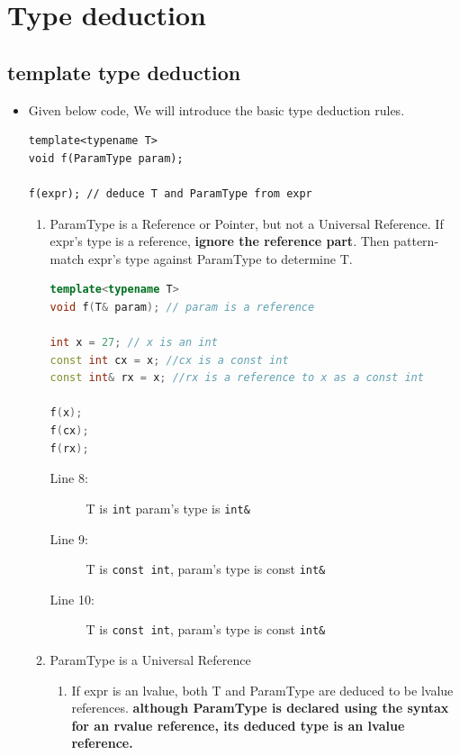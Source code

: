 \documentclass[a4paper,11pt,twoside]{book}
\begin{document}
\section{Type deduction}
\subsection{template type deduction}
\begin{itemize}

	\item Given below code, We will introduce the basic type deduction rules.
\begin{lstlisting}[numbers=none]
template<typename T>
void f(ParamType param);

f(expr); // deduce T and ParamType from expr
\end{lstlisting}

\begin{enumerate}
	
	\item ParamType is a Reference or Pointer, but not a Universal Reference. If expr's type is a reference, \textbf{ignore the reference part}. Then pattern-match expr's type against ParamType to determine T.
\begin{lstlisting}[frame=single, language=c++]
template<typename T>
void f(T& param); // param is a reference
	
int x = 27; // x is an int
const int cx = x; //cx is a const int
const int& rx = x; //rx is a reference to x as a const int
	
f(x); 
f(cx);  
f(rx); 
\end{lstlisting}
\begin{description}
	\item[Line 8:]  T is \texttt{int} param's type is \texttt{int\&}
	\item[Line 9:]  T is \texttt{const int}, param's type is const \texttt{int\&}
	\item[Line 10:] T is \texttt{const int}, param's type is const \texttt{int\&}
\end{description}
	
	\item ParamType is a Universal Reference
	
	\begin{enumerate}
		\item If expr is an lvalue, both T and ParamType are deduced to be lvalue references.
		\textbf{although ParamType is declared using the syntax for an rvalue reference, its deduced type is an lvalue reference.}
		

\end{enumerate}
\end{enumerate}
\end{itemize}
\end{document}

